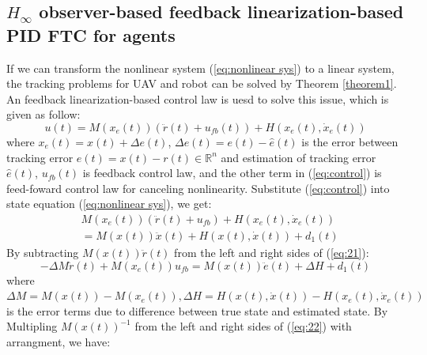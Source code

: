 \documentclass{ieeeaccess}
\begin{document}
\subsection{$H_\infty$ observer-based feedback linearization-based PID FTC for agents}
If we can transform the nonlinear system (\ref{eq:nonlinear sys}) to a linear system, the tracking problems for UAV and robot can be solved by Theorem \ref{theorem1}. An feedback linearization-based control law is uesd to solve this issue, which is given as follow:
\begin{equation} \label{eq:control}
    u(t)= M(x_e(t))(\ddot{r}(t) + u_{fb}(t)) + H(x_e(t),\dot{x}_e(t))    
\end{equation}
where $x_e(t)=x(t) + \Delta e(t)$, $\Delta e(t)=e(t)-\hat{e}(t)$ is the error between tracking error $e(t) = x(t) - r(t)\in\mathbb{R}^n$ and estimation of tracking error $\hat{e}(t)$, $u_{fb}(t)$ is feedback control law, and the other term in (\ref{eq:control}) is feed-foward control law for canceling nonlinearity. Substitute (\ref{eq:control}) into state equation (\ref{eq:nonlinear sys}), we get:
\begin{equation}\begin{split} \label{eq:21}
    & M(x_e(t))(\ddot{r}(t) + u_{fb}) + H(x_e(t),\dot{x}_e(t)) \\
    & = M(x(t))\ddot{x}(t) + H(x(t),\dot{x}(t)) + d_1(t)       
\end{split}
\end{equation}
By subtracting $M(x(t))\ddot{r}(t)$ from the left and right sides of (\ref{eq:21}):
\begin{equation} \label{eq:22}
    -\Delta M \ddot{r}(t) + M(x_e(t))u_{fb} = M(x(t))\ddot{e}(t) + \Delta H + d_1(t)
\end{equation}
where $\Delta M = M(x(t)) - M(x_e(t)), \Delta H = H(x(t),\dot{x}(t)) - H(x_e(t),\dot{x}_e(t))$ is the error terms due to difference between true state and estimated state. By Multipling $M(x(t))^{-1}$ from the left and right sides of (\ref{eq:22}) with arrangment, we have:
\end{document}
